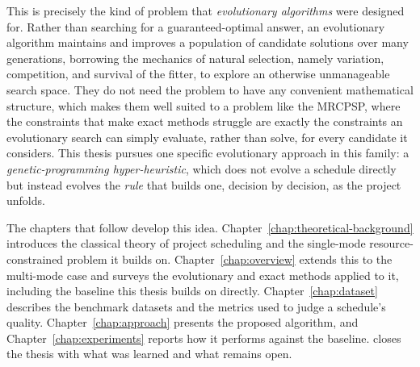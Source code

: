 This is precisely the kind of problem that \emph{evolutionary algorithms}
were designed for. Rather than searching for a guaranteed-optimal answer, an
evolutionary algorithm maintains and improves a population of candidate
solutions over many generations, borrowing the mechanics of natural
selection, namely variation, competition, and survival of the fitter, to
explore an otherwise unmanageable search space. They do not need the
problem to have any convenient mathematical structure, which makes them
well suited to a problem like the MRCPSP, where the constraints that make
exact methods struggle are exactly the constraints an evolutionary search
can simply evaluate, rather than solve, for every candidate it considers.
This thesis pursues one specific evolutionary approach in this family: a
\emph{genetic-programming hyper-heuristic}, which does not evolve a
schedule directly but instead evolves the \emph{rule} that builds one,
decision by decision, as the project unfolds.

The chapters that follow develop this idea. Chapter~\ref{chap:theoretical-background}
introduces the classical theory of project scheduling and the
single-mode resource-constrained problem it builds on.
Chapter~\ref{chap:overview} extends this to the multi-mode case and surveys
the evolutionary and exact methods applied to it, including
the baseline this thesis builds on directly. Chapter~\ref{chap:dataset}
describes the benchmark datasets and the metrics used to judge a schedule's
quality. Chapter~\ref{chap:approach}
presents the proposed algorithm, and Chapter~\ref{chap:experiments} reports
how it performs against the baseline.  closes the thesis with what was learned
and what remains open.
